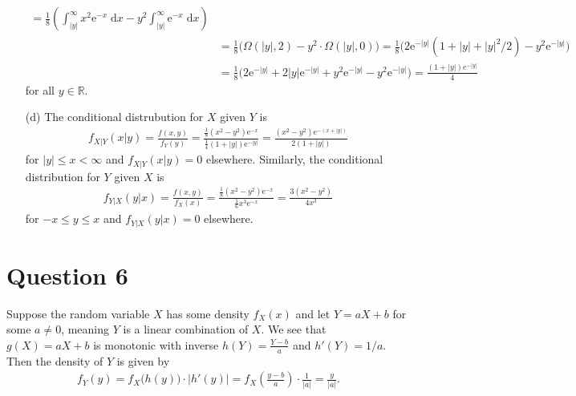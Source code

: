 \documentclass[10pt]{article}
\begin{document}
\begin{itemize}
\begin{align*}
        = \frac{1}{8} \left( \int_{|y|}^{\infty} x^2 \mathrm{e}^{-x} \;\mathrm{d}x - y^2 \int_{|y|}^{\infty} \mathrm{e}^{-x} \;\mathrm{d}x \right) \\
        &= \frac{1}{8} \Big( \Omega(|y|,2) - y^2 \cdot \Omega(|y|,0) \Big)
        = \frac{1}{8} \Big( 2\mathrm{e}^{-|y|}(1 + |y| + |y|^2/2) - y^2\mathrm{e}^{-|y|} \Big) \\
        &= \frac{1}{8} \Big( 2\mathrm{e}^{-|y|} + 2|y|\mathrm{e}^{-|y|} + y^2\mathrm{e}^{-|y|} - y^2\mathrm{e}^{-|y|} \Big)
        = \frac{(1 + |y|) e^{-|y|}}{4}
    \end{align*}
    for all \(y \in \mathbb{R}\).
    \item[(d)] The conditional distrubution for \(X\) given \(Y\) is 
    \begin{align*}
        f_{X|Y}(x|y) = \frac{f(x,y)}{f_Y(y)}
        = \frac{\frac{1}{8}(x^2 - y^2)\mathrm{e}^{-x}}{\frac{1}{4}(1 + |y|)\mathrm{e}^{-|y|}}
        = \frac{(x^2 - y^2)\mathrm{e}^{-(x + |y|)}}{2(1+|y|)}
    \end{align*}
    for \(|y| \le x < \infty\) and \(f_{X|Y}(x|y) = 0\) elsewhere. 
    Similarly, the conditional distribution for \(Y\) given \(X\) is 
    \begin{align*}
        f_{Y|X}(y|x) = \frac{f(x,y)}{f_X(x)}
        = \frac{\frac{1}{8}(x^2 - y^2)\mathrm{e}^{-x}}{\frac{1}{6}x^3 \mathrm{e}^{-x}}
        = \frac{3(x^2 - y^2)}{4x^3}
    \end{align*}
    for \(-x \le y \le x\) and \(f_{Y|X}(y|x) = 0\) elsewhere. 
\end{itemize}

\section{Question 6} \noindent
Suppose the random variable \(X\) has some density \(f_X(x)\) and let \(Y = aX + b\) for some \(a \neq 0\), meaning \(Y\) is a linear combination of \(X\). 
We see that \(g(X) = aX + b\) is monotonic with inverse \(h(Y) = \frac{Y - b}{a}\) and \(h'(Y) = 1/a\). Then the density of \(Y\) is given by 
\begin{align*}
    f_Y(y) = f_X \big( h(y) \big) \cdot \big| h'(y) \big|
    = f_X\left( \frac{y - b}{a} \right) \cdot \frac{1}{|a|} = \frac{y}{|a|}.
\end{align*}
\end{document}

